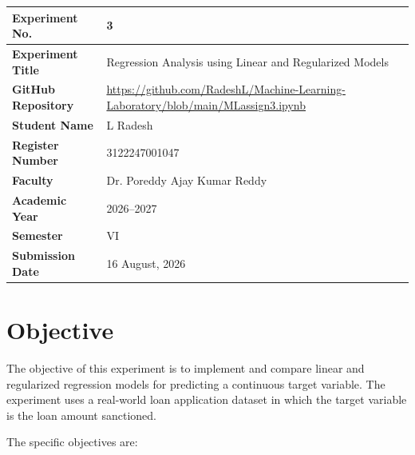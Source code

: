 \documentclass[12pt,a4paper]{article}
\begin{document}
\begin{tabular}{|p{4.2cm}|p{10.3cm}|}
\hline
\textbf{Experiment No.} & 3 \\ \hline

\textbf{Experiment Title} &
Regression Analysis using Linear and Regularized Models \\ \hline

\textbf{GitHub Repository} &
\url{https://github.com/RadeshL/Machine-Learning-Laboratory/blob/main/MLassign3.ipynb} \\ \hline

\textbf{Student Name} &
L Radesh \\ \hline

\textbf{Register Number} &
3122247001047 \\ \hline

\textbf{Faculty} &
Dr. Poreddy Ajay Kumar Reddy \\ \hline

\textbf{Academic Year} &
2026--2027 \\ \hline

\textbf{Semester} &
VI \\ \hline

\textbf{Submission Date} &
16 August, 2026 \\ \hline

\end{tabular}

\vspace{0.5cm}


\section{Objective}

The objective of this experiment is to implement and compare linear and
regularized regression models for predicting a continuous target variable.
The experiment uses a real-world loan application dataset in which the
target variable is the loan amount sanctioned.

The specific objectives are:
\end{document}
